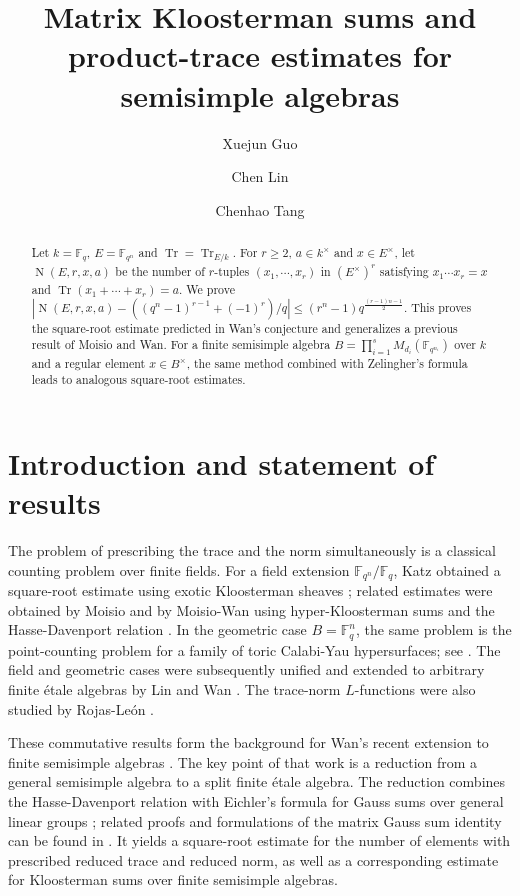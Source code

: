 \documentclass[11pt]{amsart}
\title{Matrix Kloosterman sums and product-trace estimates for semisimple algebras
}
\author{Xuejun Guo}
\author{Chen Lin}
\author{Chenhao Tang}
\date{}
\theoremstyle{remark}
\newcommand{\F}{\mathbb F}
\newcommand{\Tr}{\operatorname{Tr}}
\newcommand{\Nm}{\operatorname{N}}
\begin{document}
\begin{abstract}
Let $k=\F_q$, $E=\F_{q^n}$ and $\Tr=\Tr_{E/k}$. For $r\ge 2$, $a\in k^{\times}$ and $x\in E^{\times}$, let $\Nm(E,r,x,a)$ be the number of $r$-tuples $(x_1,\cdots,x_r)$ in $(E^{\times})^r$ satisfying
$x_1\cdots x_r=x$ and $\Tr(x_1+\cdots+x_r)=a$. We prove 
$\left|\Nm(E,r,x,a)-\left((q^n-1)^{r-1}+(-1)^r\right)/q\right|\le (r^n-1) q^{\frac{(r-1)n-1}{2}}$. This proves the square-root estimate predicted in Wan's conjecture and generalizes a previous result of Moisio and Wan. For a finite semisimple algebra
$B=\prod\limits_{i=1}^s M_{d_i}(\F_{q^{n_i}})$ over $k$ and a regular element $x\in B^{\times}$, the same method combined with Zelingher's formula leads to analogous square-root estimates.
\end{abstract}

\maketitle

\section{Introduction and statement of results}
The problem of prescribing the trace and the norm simultaneously is a classical counting problem over finite fields. For a field extension $\F_{q^n}/\F_q$, Katz obtained a square-root estimate using exotic Kloosterman sheaves \cite{KatzSoto}; related estimates were obtained by Moisio and by Moisio-Wan using hyper-Kloosterman sums and the
Hasse-Davenport relation \cite{MoisioKloosterman,MoisioWan}. In the geometric case $B=\F_{q}^n$, the same problem is the point-counting problem for
a family of toric Calabi-Yau hypersurfaces; see
\cite{RojasLeonWanMoments,WanLectures}. The field and geometric cases were subsequently unified and extended to arbitrary finite \'etale algebras by
Lin and Wan \cite{LinWanEtale}. The trace-norm $L$-functions were also studied by Rojas-Le\'on
\cite{RojasLeonTraceNorm}.

These commutative results form the background for Wan's recent extension to finite semisimple algebras \cite{WanNormTrace}. The key point of that work is
a reduction from a general semisimple algebra to a split finite \'etale algebra. The reduction combines the Hasse-Davenport relation with Eichler's formula for Gauss sums over general linear groups
\cite{EichlerGauss}; related proofs and formulations of the matrix Gauss sum identity can be found in \cite{LamprechtGauss,KimGauss,LiHuGauss}. It yields
a square-root estimate for the number of elements with prescribed reduced trace and reduced norm, as well as a corresponding estimate for Kloosterman
sums over finite semisimple algebras.
\end{document}
